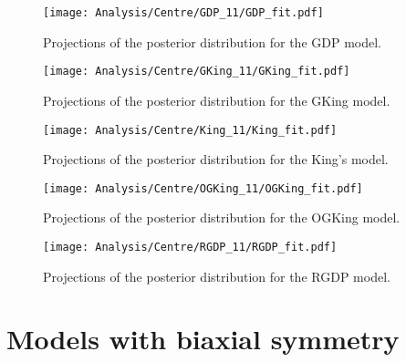 \begin {figure}
 \centering
 \texttt{[image: Analysis/Centre/GDP\_11/GDP\_fit.pdf]}
  \caption{Projections of the posterior distribution for the GDP model.}
\label{fig:GDPctr}
\end {figure}

\begin {figure}
 \centering
 \texttt{[image: Analysis/Centre/GKing\_11/GKing\_fit.pdf]}
  \caption{Projections of the posterior distribution for the GKing model.}
\label{fig:GKingctr}
\end {figure}

\begin {figure}
 \centering
 \texttt{[image: Analysis/Centre/King\_11/King\_fit.pdf]}
  \caption{Projections of the posterior distribution for the King's model.}
\label{fig:Kingctr}
\end {figure}

\begin {figure}
 \centering
 \texttt{[image: Analysis/Centre/OGKing\_11/OGKing\_fit.pdf]}
  \caption{Projections of the posterior distribution for the OGKing model.}
\label{fig:OGKingctr}
\end {figure}

\begin {figure}
 \centering
 \texttt{[image: Analysis/Centre/RGDP\_11/RGDP\_fit.pdf]}
  \caption{Projections of the posterior distribution for the RGDP model.}
\label{fig:RGDPctr}
\end {figure}
\section{Models with biaxial symmetry}
\label{sect:app_biaxial}


